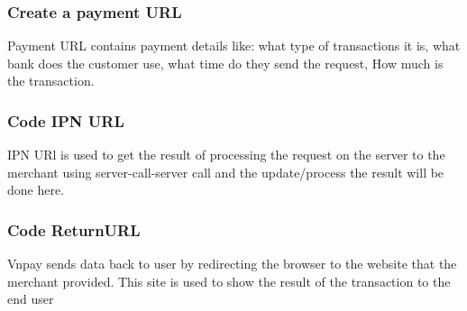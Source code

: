 \documentclass[12pt,a4paper]{article}
\begin{document}
\subsubsection{Create a payment URL}
Payment URL contains payment details like: what type of transactions it is, what bank does the customer use, what time do they send the request, How much is the transaction. 
\subsubsection{Code IPN URL}
IPN URl is used to get the result of processing the request on the server to the merchant using server-call-server call and the update/process the result will be done here.
\subsubsection{Code ReturnURL}
Vnpay sends data back to user by redirecting the browser to the website that the merchant provided. This site is used to show the result of the transaction to the end user
\end{document}
